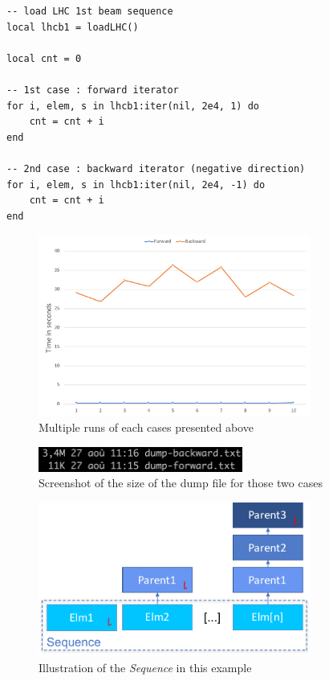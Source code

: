 \begin{lstlisting}[style=LuaStyle]
-- load LHC 1st beam sequence
local lhcb1 = loadLHC()

local cnt = 0

-- 1st case : forward iterator
for i, elem, s in lhcb1:iter(nil, 2e4, 1) do
	cnt = cnt + i
end

-- 2nd case : backward iterator (negative direction)
for i, elem, s in lhcb1:iter(nil, 2e4, -1) do
	cnt = cnt + i
end
\end{lstlisting}

\begin{figure}[H]
    \centering
    \includegraphics[width=0.8\textwidth]{./Images/seq-iter-curve.pdf}
    \caption{Multiple runs of each cases presented above}
    \label{fig:MO-seq-iter-curve}
\end{figure}

\begin{figure}[H]
    \centering
    \includegraphics[width=0.6\textwidth]{./Images/dump-size}
    \caption{Screenshot of the size of the dump file for those two cases}
    \label{fig:MO-seq-iter}
\end{figure}

\begin{figure}[H]
    \centering
    \includegraphics[width=0.8\textwidth]{./Images/seq-iter-schematic.pdf}
    \caption{Illustration of the \emph{Sequence} in this example}
    \label{fig:MO-seq-iter-schematic}
\end{figure}
